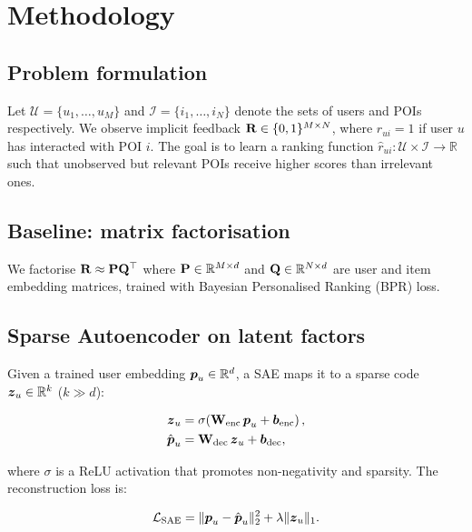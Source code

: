\chapter{Methodology}
\label{chap:methodology}


\section{Problem formulation}

Let $\mathcal{U} = \{u_1, \dots, u_M\}$ and $\mathcal{I} = \{i_1, \dots, i_N\}$
denote the sets of users and POIs respectively.
We observe implicit feedback $\mathbf{R} \in \{0,1\}^{M \times N}$, where
$r_{ui} = 1$ if user $u$ has interacted with POI $i$.
The goal is to learn a ranking function $\hat{r}_{ui} : \mathcal{U} \times
\mathcal{I} \to \mathbb{R}$ such that unobserved but relevant POIs receive
higher scores than irrelevant ones.

\section{Baseline: matrix factorisation}

We factorise $\mathbf{R} \approx \mathbf{P} \mathbf{Q}^\top$ where
$\mathbf{P} \in \mathbb{R}^{M \times d}$ and $\mathbf{Q} \in \mathbb{R}^{N \times d}$
are user and item embedding matrices, trained with Bayesian Personalised
Ranking (BPR) loss.

\section{Sparse Autoencoder on latent factors}

Given a trained user embedding $\boldsymbol{p}_u \in \mathbb{R}^d$, a SAE maps it to
a sparse code $\boldsymbol{z}_u \in \mathbb{R}^k$ ($k \gg d$):

\begin{align}
  \boldsymbol{z}_u &= \sigma\!\left(\mathbf{W}_{\text{enc}}\,\boldsymbol{p}_u + \boldsymbol{b}_{\text{enc}}\right), \\
  \hat{\boldsymbol{p}}_u &= \mathbf{W}_{\text{dec}}\,\boldsymbol{z}_u + \boldsymbol{b}_{\text{dec}},
\end{align}

where $\sigma$ is a ReLU activation that promotes non-negativity and sparsity.
The reconstruction loss is:

\begin{equation}
  \mathcal{L}_{\text{SAE}} = \|\boldsymbol{p}_u - \hat{\boldsymbol{p}}_u\|_2^2
                            + \lambda \|\boldsymbol{z}_u\|_1.
\end{equation}

